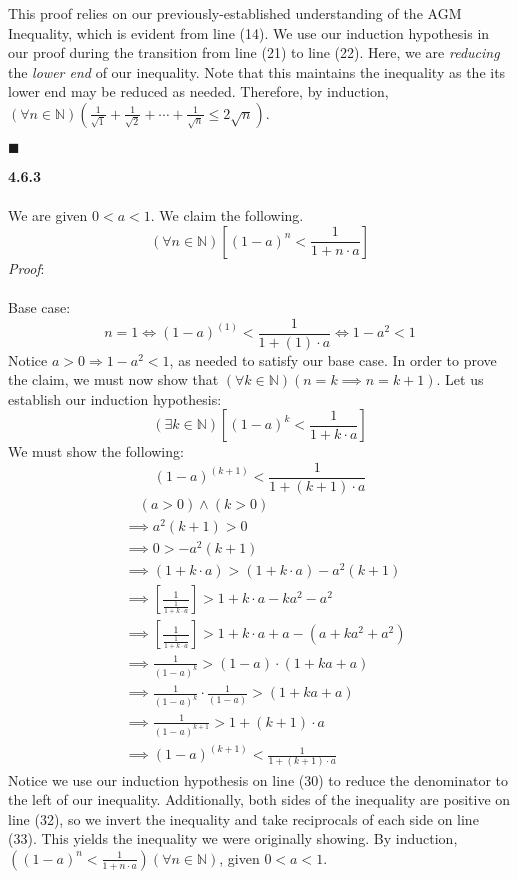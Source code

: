 \documentclass[12pt]{article}
\begin{document}
This proof relies on our previously-established understanding of the AGM Inequality, which is evident from line (14). We use our induction hypothesis in our proof during the transition from line (21) to line (22). Here, we are \emph{reducing} the \emph{lower end} of our inequality. Note that this maintains the inequality as the its lower end may be reduced as needed. Therefore, by induction, $(\forall n \in \mathbb{N})(\frac{1}{\sqrt{1}}+\frac{1}{\sqrt{2}}+\cdots+\frac{1}{\sqrt{n}} \leq 2 \sqrt{n})$.
\begin{flushright}
$\blacksquare$
\end{flushright}
\textbf{4.6.3}\\\\
We are given $0<a<1$. We claim the following. $$(\forall n \in \mathbb{N})\left[(1-a)^{n}<\frac{1}{1+n \cdot a}\right]$$
\emph{Proof}:\\\\
Base case:
$$n=1 \iff (1-a)^{(1)}<\frac{1}{1+(1)\cdot a} \iff 1-a^2<1$$
Notice $a>0 \Rightarrow 1-a^2 < 1$, as needed to satisfy our base case. In order to prove the claim, we must now show that $(\forall k \in \mathbb{N})(n=k \implies n=k+1)$. Let us establish our induction hypothesis: $$(\exists k \in \mathbb{N})\left[(1-a)^{k}<\frac{1}{1+k \cdot a}\right]$$
We must show the following: $$\boxed{(1-a)^{(k+1)}<\frac{1}{1+(k+1) \cdot a}}$$
\begin{align}
&\quad (a>0) \land (k>0)\\
&\implies a^2(k+1)>0\\
&\implies 0>-a^2(k+1)\\
&\implies (1+k \cdot a)>(1+k \cdot a) -a^2(k+1)\\
&\implies \left[\frac{1}{\frac{1}{1+k \cdot a}}\right]>1+k \cdot a - ka^2-a^2\\
&\implies \left[\frac{1}{\frac{1}{1+k \cdot a}}\right]>1+k \cdot a+a-(a + ka^2 + a^2)\\
&\implies \frac{1}{(1-a)^k}>(1-a)\cdot(1 + ka + a)\\
&\implies \frac{1}{(1-a)^k}\cdot \frac{1}{(1-a)}>(1 + ka + a)\\
&\implies \frac{1}{(1-a)^{k+1}}>1 + (k+1)\cdot a\\
&\implies (1-a)^{(k+1)}<\frac{1}{1+(k+1) \cdot a}
\end{align}
Notice we use our induction hypothesis on line (30) to reduce the denominator to the left of our inequality. Additionally, both sides of the inequality are positive on line (32), so we invert the inequality and take reciprocals of each side on line (33). This yields the inequality we were originally showing. By induction, $((1-a)^{n}<\frac{1}{1+n \cdot a})(\forall n \in \mathbb{N})$, given $0<a<1$.
\end{document}
